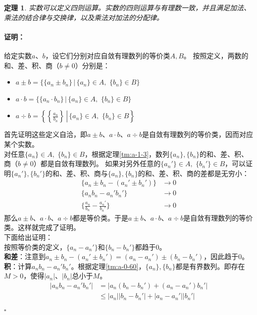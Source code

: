 \documentclass[12pt,UTF8]{ctexbook}
\newtheorem{tm}{定理}[section]
\renewenvironment{proof}{\paragraph{\textbf{证明：}}}{\hfill$\square$}
\begin{document}
\begin{appendix}
\begin{tm}\label{tm:a-1-20}
    实数可以定义四则运算。实数的四则运算与有理数一致，并且满足加法、乘法的结合律与交换律，以及乘法对加法的分配律。
\end{tm}
\begin{proof}
    给定实数$a$、$b$，设它们分别对应自敛有理数列的等价类$A,B$。
    按照定义，两数的和、差、积、商（$b\neq 0$）分别是：
    \begin{itemize}
        \item $a \pm b = \{\{a_n \pm b_n\} \, |\, \{a_n\}\in A,\,\,\{b_n\}\in B \}$
        \item $a\cdot b = \{\{a_n \cdot b_n\} \, |\, \{a_n\}\in A,\,\,\{b_n\}\in B \}$
        \item $a\div b = \left.\left\{\left\{\frac{a_n}{b_n}\right\} \, \right|\, \{a_n\}\in A,\,\,\{b_n\}\in B \right\}$
    \end{itemize}
    首先证明这些定义自洽，即$a\pm b$、$a\cdot b$、$a\div b$是自敛有理数列的等价类，因而对应某个实数。\\
    对任意$\{a_n\}\in A,\,\,\{b_n\}\in B$，根据定理\ref{tm:a-1-3}，数列$\{a_n\}, \{b_n\}$的和、差、积、商（$b\neq 0$）都是自敛有理数列。
    如果对另外任意的$\{a_n'\}\in A,\,\,\{b_n'\}\in B$，可以证明$\{a_n'\}, \{b_n'\}$的和、差、积、商与$\{a_n\}, \{b_n\}$的和、差、积、商的差都是无穷小：
    \begin{align*}
        \{a_n \pm b_n - (a_n' \pm b_n')\} &\to 0  \\
        \{a_nb_n - a_n'b_n'\} &\to 0  \\
        \{\frac{a_n}{b_n} - \frac{a_n'}{b_n'}\} &\to 0  
    \end{align*}
    那么$a\pm b$、$a\cdot b$、$a\div b$都是等价类。于是$a\pm b$、$a\cdot b$、$a\div b$是自敛有理数列的等价类。这样就完成了证明。\\
    下面给出证明：\\
    按照等价类的定义，$\{a_n - a_n'\}$和$\{b_n - b_n'\}$都趋于$0$。\\
    \textbf{和差}：注意到$a_n \pm b_n - (a_n' \pm b_n') = (a_n - a_n') \pm (b_n - b_n')$，因此趋于$0$。\\
    \textbf{积}：计算$a_nb_n - a_n'b_n'$。根据定理\ref{tm:a-0-60}，$\{a_n\}, \{b_n\}$都是有界数列。即存在$M>0$，使得$|a_n|$、$|b_n|$总小于$M$。
    \begin{align*}
        |a_nb_n - a_n'b_n'| &= |a_n(b_n - b_n') + (a_n - a_n')b_n'|  \\
        &\leqslant |a_n||b_n - b_n'| + |a_n - a_n'||b_n'|  \\

\end{align*}
\end{proof}
\end{appendix}
\end{document}
